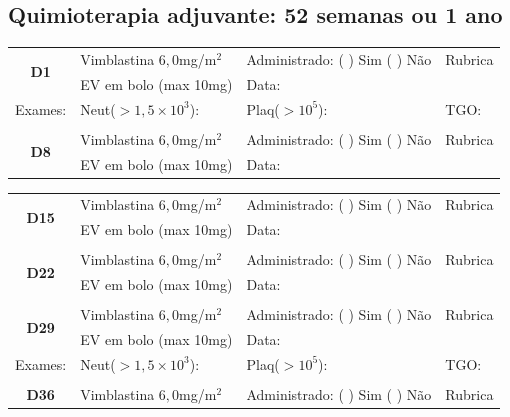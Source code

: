\documentclass[11pt,a4paper,oldfontcommands]{memoir}
\begin{document}
\subsection{Quimioterapia adjuvante: 52 semanas ou 1 ano}
\begin{center}
\begin{table}[H]
\begin{tabular}{p{}p{}|p{}|p{3cm}}
    \hline
    \multicolumn{1}{c|}{\multirow{2}{*}{\textbf{D1}}}&{Vimblastina \(6,0\)mg/m\(^2\)}&{Administrado: (  ) Sim (  ) Não}&{Rubrica}\\
    \multicolumn{1}{c|}{}&{EV em bolo (max 10mg)}&{Data:}&\\
    \hline
    {Exames:}&{Neut(\(>1,5\times10^3\)):}&{Plaq(\(>10^5\)):}&{TGO:}
    \\
    \hline
    \\
    \hline
    \multicolumn{1}{c|}{\multirow{2}{*}{\textbf{D8}}}&{Vimblastina \(6,0\)mg/m\(^2\)}&{Administrado: (  ) Sim (  ) Não}&{Rubrica}\\
    \multicolumn{1}{c|}{}&{EV em bolo (max 10mg)}&{Data:}&\\
    \hline
\end{tabular}
\end{table}
\begin{table}[H]
\begin{tabular}{p{}p{}|p{}|p{3cm}}
    \hline
    \multicolumn{1}{c|}{\multirow{2}{*}{\textbf{D15}}}&{Vimblastina \(6,0\)mg/m\(^2\)}&{Administrado: (  ) Sim (  ) Não}&{Rubrica}\\
    \multicolumn{1}{c|}{}&{EV em bolo (max 10mg)}&{Data:}&\\
    \hline
    \\
    \hline
    \multicolumn{1}{c|}{\multirow{2}{*}{\textbf{D22}}}&{Vimblastina \(6,0\)mg/m\(^2\)}&{Administrado: (  ) Sim (  ) Não}&{Rubrica}\\
    \multicolumn{1}{c|}{}&{EV em bolo (max 10mg)}&{Data:}&\\
    \hline
    \\
    \hline
    \multicolumn{1}{c|}{\multirow{2}{*}{\textbf{D29}}}&{Vimblastina \(6,0\)mg/m\(^2\)}&{Administrado: (  ) Sim (  ) Não}&{Rubrica}\\
    \multicolumn{1}{c|}{}&{EV em bolo (max 10mg)}&{Data:}&\\
    \hline
    {Exames:}&{Neut(\(>1,5\times10^3\)):}&{Plaq(\(>10^5\)):}&{TGO:}
    \\
    \hline\\
    \hline
    \multicolumn{1}{c|}{\multirow{2}{*}{\textbf{D36}}}&{Vimblastina \(6,0\)mg/m\(^2\)}&{Administrado: (  ) Sim (  ) Não}&{Rubrica}\\

\end{tabular}
\end{table}
\end{center}
\end{document}
